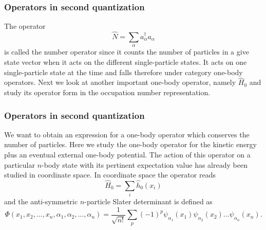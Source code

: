 \documentclass[compress]{beamer}
\begin{document}
\frame
{
  \frametitle{Operators in second quantization}
\begin{small}
{\scriptsize
The operator 
\begin{equation}
	\hat{N} = \sum_\alpha a_\alpha^\dagger a_\alpha \label{eq:2-22}
\end{equation}
is called the number operator since it counts the number of particles in a give state vector when it acts 
on the different single-particle states.  It acts on one single-particle state at the time and falls 
therefore under category one-body operators.
Next we look at another important one-body operator, namely $\hat{H}_0$ and study its operator form in the 
occupation number representation.
}
\end{small}
}


\frame
{
  \frametitle{Operators in second quantization}
\begin{small}
{\scriptsize
We want to obtain an expression for a one-body operator which conserves the number of particles.
Here we study the one-body operator for the kinetic energy plus an eventual external one-body potential.
The action of this operator on a particular $n$-body state with its pertinent expectation value has already
been studied in coordinate  space.
In coordinate space the operator reads
\begin{equation}
	\hat{H}_0 = \sum_i \hat{h}_0(x_i) \label{eq:2-23}
\end{equation}
and the anti-symmetric $n$-particle Slater determinant is defined as 
\begin{equation}
\Phi(x_1, x_2,\dots ,x_n,\alpha_1,\alpha_2,\dots, \alpha_n)= \frac{1}{\sqrt{n!}} \sum_p (-1)^p
		\psi_{\alpha_1}(x_1)\psi_{\alpha_2}(x_2) \dots \psi_{\alpha_n}(x_n).\label{eq:2-24}
\end{equation}
}
\end{small}
}
\end{document}
